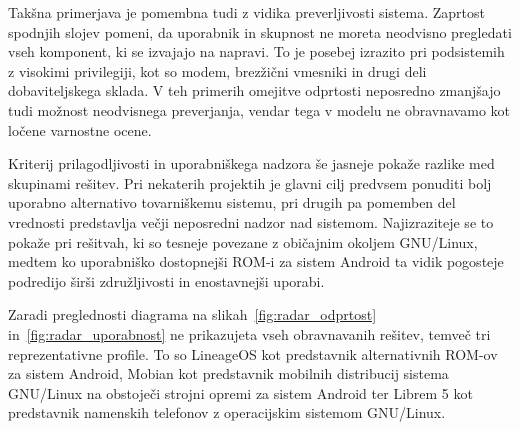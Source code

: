 \documentclass[a4paper,12pt,openright]{book}
\begin{document}
Takšna primerjava je pomembna tudi z vidika preverljivosti sistema.
Zaprtost spodnjih slojev pomeni, da uporabnik in skupnost ne moreta neodvisno pregledati vseh komponent, ki se izvajajo na napravi.
To je posebej izrazito pri podsistemih z visokimi privilegiji, kot so modem, brezžični vmesniki in drugi deli dobaviteljskega sklada.
V teh primerih omejitve odprtosti neposredno zmanjšajo tudi možnost neodvisnega preverjanja, vendar tega v modelu ne obravnavamo kot ločene varnostne ocene.

Kriterij prilagodljivosti in uporabniškega nadzora še jasneje pokaže razlike med skupinami rešitev.
Pri nekaterih projektih je glavni cilj predvsem ponuditi bolj uporabno alternativo tovarniškemu sistemu, pri drugih pa pomemben del vrednosti predstavlja večji neposredni nadzor nad sistemom.
Najizraziteje se to pokaže pri rešitvah, ki so tesneje povezane z običajnim okoljem GNU/Linux, medtem ko uporabniško dostopnejši ROM-i za sistem Android ta vidik pogosteje podredijo širši združljivosti in enostavnejši uporabi.

Zaradi preglednosti diagrama na slikah~\ref{fig:radar_odprtost} in~\ref{fig:radar_uporabnost} ne prikazujeta vseh obravnavanih rešitev, temveč tri reprezentativne profile.
To so LineageOS kot predstavnik alternativnih ROM-ov za sistem Android, Mobian kot predstavnik mobilnih distribucij sistema GNU/Linux na obstoječi strojni opremi za sistem Android ter Librem 5 kot predstavnik namenskih telefonov z operacijskim sistemom GNU/Linux.
\end{document}
